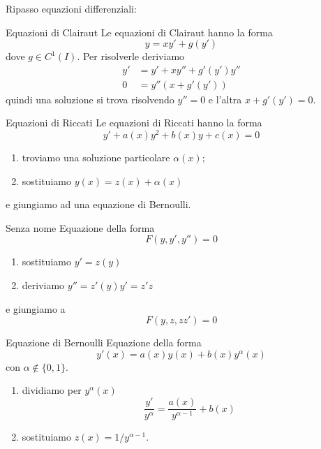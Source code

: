 \documentclass[a4paper]{article}
\begin{document}
Ripasso equazioni differenziali:

\begin{snippetdefinition}{Equazioni di Clairaut}
    Le equazioni di Clairaut hanno la forma
    \[
        y = xy' +g(y')
    \]
    dove \(g \in C^1(I)\). Per risolverle deriviamo
    \begin{align*}
        y' &= y' + xy'' + g'(y')y'' \\
        0 &= y''(x + g'(y'))
    \end{align*}
    quindi una soluzione si trova risolvendo \(y'' = 0\)
    e l'altra \(x + g'(y') = 0\).
\end{snippetdefinition}

\begin{snippetdefinition}{Equazioni di Riccati}
    Le equazioni di Riccati hanno la forma
    \[
        y' + a(x) y^2 + b(x)y + c(x) = 0
    \]
    \begin{enumerate}
        \item troviamo una soluzione particolare \(\alpha(x)\);
        \item sostituiamo \(y(x) = z(x) + \alpha(x)\)
    \end{enumerate}
    e giungiamo ad una equazione di Bernoulli.
\end{snippetdefinition}

\begin{snippetdefinition}{Senza nome}
    Equazione della forma
    \[
        F(y,y',y'')=0
    \]
    \begin{enumerate}
        \item sostituiamo \(y' = z(y)\)
        \item deriviamo \(y'' = z'(y)y' = z'z\)
    \end{enumerate}
    e giungiamo a
    \[
        F(y, z, zz') = 0
    \]
\end{snippetdefinition}

\begin{snippetproposition}{Equazione di Bernoulli}
    Equazione della forma
    \[
        y'(x) = a(x)y(x) + b(x) y^\alpha(x)
    \]
    con \(\alpha \notin \{0,1\}\).
    \begin{enumerate}
        \item dividiamo per \(y^\alpha(x)\)
        \[
            \frac{y'}{y^\alpha} = \frac{a(x)}{y^{\alpha - 1}} + b(x)
        \]
        \item sostituiamo \(z(x) = 1 / y^{\alpha - 1}\).
    \end{enumerate}
\end{snippetproposition}
\end{document}
